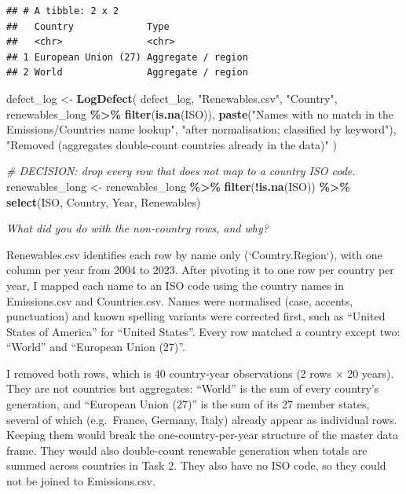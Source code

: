 \documentclass[
]{article}
\newenvironment{Shaded}{\begin{snugshade}}{\end{snugshade}}
\newcommand{\CommentTok}[1]{\textcolor[rgb]{0.56,0.35,0.01}{\textit{#1}}}
\newcommand{\FunctionTok}[1]{\textcolor[rgb]{0.13,0.29,0.53}{\textbf{#1}}}
\newcommand{\NormalTok}[1]{#1}
\newcommand{\OtherTok}[1]{\textcolor[rgb]{0.56,0.35,0.01}{#1}}
\newcommand{\SpecialCharTok}[1]{\textcolor[rgb]{0.81,0.36,0.00}{\textbf{#1}}}
\newcommand{\StringTok}[1]{\textcolor[rgb]{0.31,0.60,0.02}{#1}}
\begin{document}
\begin{verbatim}
## # A tibble: 2 x 2
##   Country             Type              
##   <chr>               <chr>             
## 1 European Union (27) Aggregate / region
## 2 World               Aggregate / region
\end{verbatim}

\begin{Shaded}
\begin{Highlighting}[]
\NormalTok{defect\_log }\OtherTok{\textless{}{-}} \FunctionTok{LogDefect}\NormalTok{(}
\NormalTok{  defect\_log, }\StringTok{"Renewables.csv"}\NormalTok{, }\StringTok{"Country"}\NormalTok{,}
\NormalTok{  renewables\_long }\SpecialCharTok{\%\textgreater{}\%} \FunctionTok{filter}\NormalTok{(}\FunctionTok{is.na}\NormalTok{(ISO)),}
  \FunctionTok{paste}\NormalTok{(}\StringTok{"Names with no match in the Emissions/Countries name lookup"}\NormalTok{,}
        \StringTok{"after normalisation; classified by keyword"}\NormalTok{),}
  \StringTok{"Removed (aggregates double{-}count countries already in the data)"}
\NormalTok{)}

\CommentTok{\# DECISION: drop every row that does not map to a country ISO code.}
\NormalTok{renewables\_long }\OtherTok{\textless{}{-}}\NormalTok{ renewables\_long }\SpecialCharTok{\%\textgreater{}\%}
  \FunctionTok{filter}\NormalTok{(}\SpecialCharTok{!}\FunctionTok{is.na}\NormalTok{(ISO)) }\SpecialCharTok{\%\textgreater{}\%}
  \FunctionTok{select}\NormalTok{(ISO, Country, Year, Renewables)}
\end{Highlighting}
\end{Shaded}

\emph{What did you do with the non-country rows, and why?}

Renewables.csv identifies each row by name only (`Country.Region`), with
one column per year from 2004 to 2023. After pivoting it to one row per
country per year, I mapped each name to an ISO code using the country
names in Emissions.csv and Countries.csv. Names were normalised (case,
accents, punctuation) and known spelling variants were corrected first,
such as ``United States of America'' for ``United States''. Every row
matched a country except two: ``World'' and ``European Union (27)''.

I removed both rows, which is 40 country-year observations (2 rows × 20
years). They are not countries but aggregates: ``World'' is the sum of
every country's generation, and ``European Union (27)'' is the sum of
its 27 member states, several of which (e.g.~France, Germany, Italy)
already appear as individual rows. Keeping them would break the
one-country-per-year structure of the master data frame. They would also
double-count renewable generation when totals are summed across
countries in Task 2. They also have no ISO code, so they could not be
joined to Emissions.csv.
\end{document}
